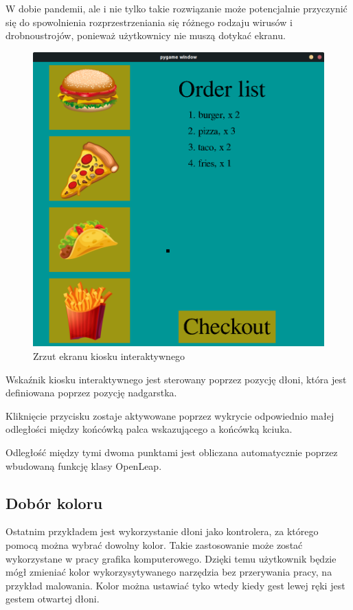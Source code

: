 \quad W dobie pandemii, ale i nie tylko takie rozwiązanie może potencjalnie przyczynić się do spowolnienia rozprzestrzeniania się różnego rodzaju wirusów i drobnoustrojów, ponieważ użytkownicy nie muszą dotykać ekranu. 

\begin{figure}[H]
    \begin{center}
        \includegraphics[width=15cm]{../images/checkout_window.png}
        \caption{Zrzut ekranu kiosku interaktywnego}
    \end{center}
\end{figure}

\quad Wskaźnik kiosku interaktywnego jest sterowany poprzez pozycję dłoni, która jest definiowana poprzez pozycję nadgarstka. 

\quad Kliknięcie przycisku zostaje aktywowane poprzez wykrycie odpowiednio małej odległości między końcówką palca wskazującego a końcówką kciuka. 

\quad Odległość między tymi dwoma punktami jest obliczana automatycznie poprzez wbudowaną funkcję klasy OpenLeap. 

\subsection{Dobór koloru}
\quad Ostatnim przykładem jest wykorzystanie dłoni jako kontrolera, za którego pomocą można wybrać dowolny kolor. Takie zastosowanie może zostać wykorzystane w pracy grafika komputerowego. Dzięki temu użytkownik będzie mógł zmieniać kolor wykorzysytywanego narzędzia bez przerywania pracy, na przykład malowania. Kolor można ustawiać tyko wtedy kiedy gest lewej ręki jest gestem otwartej dłoni. 


